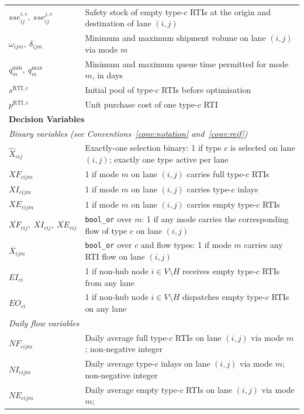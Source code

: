 \begin{longtable}{|p{}|p{}|}
$sse^{i,c}_{ij},\ sse^{j,c}_{ij}$
  & Safety stock of empty type-$c$ RTIs at the origin and
    destination of lane $(i,j)$ \\
$\omega_{ijm},\ \delta_{ijm}$
  & Minimum and maximum shipment volume on lane $(i,j)$
    via mode $m$ \\
$q^{\min}_{m},\ q^{\max}_{m}$
  & Minimum and maximum queue time permitted for mode $m$,
    in days \\
$s^{\text{RTI},c}$
  & Initial pool of type-$c$ RTIs before optimisation \\
$p^{\text{RTI},c}$
  & Unit purchase cost of one type-$c$ RTI \\
\hline
\multicolumn{2}{|l|}{\textbf{Decision Variables}}\\ \hline
\multicolumn{2}{|l|}{\textit{Binary variables (see
    Conventions~\ref{conv:notation} and~\ref{conv:reif})}}\\ \hline
$\hat{X}_{cij}$
  & Exactly-one selection binary: 1 if type $c$ is selected on
    lane $(i,j)$; exactly one type active per lane \\
$XF_{cijm}$
  & 1 if mode $m$ on lane $(i,j)$ carries full type-$c$ RTIs \\
$XI_{cijm}$
  & 1 if mode $m$ on lane $(i,j)$ carries type-$c$ inlays \\
$XE_{cijm}$
  & 1 if mode $m$ on lane $(i,j)$ carries empty type-$c$ RTIs \\
$\overline{XF}_{cij},\
 \overline{XI}_{cij},\
 \overline{XE}_{cij}$
  & \texttt{bool\_or} over $m$: 1 if any mode carries the
    corresponding flow of type $c$ on lane $(i,j)$ \\
$\overline{X}_{ijm}$
  & \texttt{bool\_or} over $c$ and flow types: 1 if mode $m$
    carries any RTI flow on lane $(i,j)$ \\
$EI_{ci}$
  & 1 if non-hub node $i \in V\setminus H$ receives empty
    type-$c$ RTIs from any lane \\
$EO_{ci}$
  & 1 if non-hub node $i \in V\setminus H$ dispatches empty
    type-$c$ RTIs on any lane \\
\hline
\multicolumn{2}{|l|}{\textit{Daily flow variables}}\\ \hline
$NF_{cijm}$
  & Daily average full type-$c$ RTIs on lane $(i,j)$ via mode $m$;
    non-negative integer \\
$NI_{cijm}$
  & Daily average type-$c$ inlays on lane $(i,j)$ via mode $m$;
    non-negative integer \\
$NE_{cijm}$
  & Daily average empty type-$c$ RTIs on lane $(i,j)$ via mode $m$;

\end{longtable}
